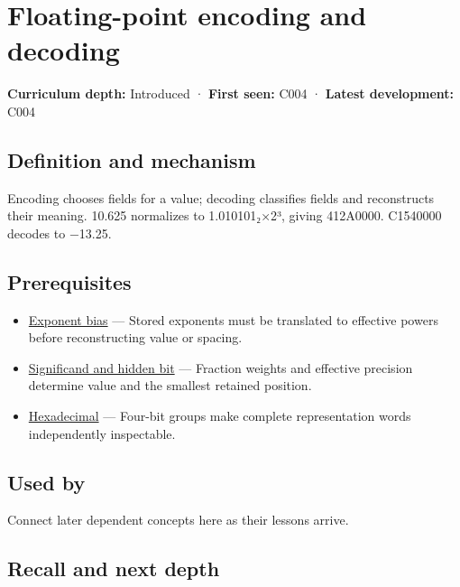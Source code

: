 \hypertarget{appendix-6854d0e2218e}{}
\section{Floating-point encoding and decoding}\label{appendix-6854d0e2218e-floating-point-encoding-and-decoding}

\textbf{Curriculum depth:} Introduced · \textbf{First seen:} C004 · \textbf{Latest development:} C004

\subsection{Definition and mechanism}\label{appendix-6854d0e2218e-definition-and-mechanism}

Encoding chooses fields for a value; decoding classifies fields and reconstructs their meaning. 10.625 normalizes to 1.010101₂×2³, giving 412A0000. C1540000 decodes to −13.25.

\subsection{Prerequisites}\label{appendix-6854d0e2218e-prerequisites}

\begin{itemize}
\tightlist
\item
  \hyperref[appendix-2fae058c82e1]{Exponent bias} --- Stored exponents must be translated to effective powers before reconstructing value or spacing.
\item
  \hyperref[appendix-a24fd710cf67]{Significand and hidden bit} --- Fraction weights and effective precision determine value and the smallest retained position.
\item
  \hyperref[appendix-6b8075763724]{Hexadecimal} --- Four-bit groups make complete representation words independently inspectable.
\end{itemize}

\subsection{Used by}\label{appendix-6854d0e2218e-used-by}

Connect later dependent concepts here as their lessons arrive.

\subsection{Recall and next depth}\label{appendix-6854d0e2218e-recall-and-next-depth}

